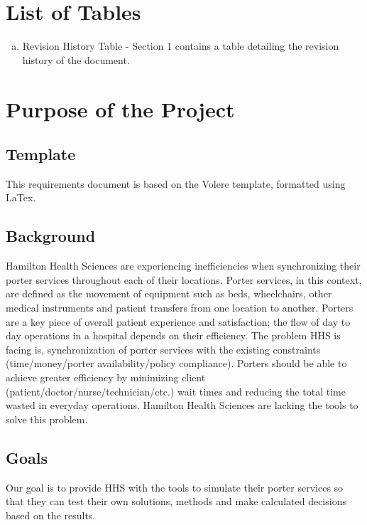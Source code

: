 \documentclass[paper=letter, fontsize=10pt]{scrartcl}
\numberwithin{equation}{section}		%
\numberwithin{figure}{section}			%
\numberwithin{table}{section}				%
\begin{document}
\section{List of Tables}
\begin{enumerate}[(a)]
	\item Revision History Table - Section 1 contains a table detailing the revision history of the document.
\end{enumerate}

\section{Purpose of the Project}
\subsection{Template}
This requirements document is based on the Volere template, formatted using LaTex.
\subsection{Background}
Hamilton Health Sciences are experiencing inefficiencies when synchronizing their porter services throughout each of their locations. Porter services, in this context, are defined as the movement of equipment such as beds, wheelchairs, other medical instruments and patient transfers from one location to another. Porters are a key piece of overall patient experience and satisfaction; the flow of day to day operations in a hospital depends on their efficiency. The problem HHS is facing is, synchronization of porter services with the existing constraints (time/money/porter availability/policy compliance).  Porters should be able to achieve greater efficiency by minimizing client (patient/doctor/nurse/technician/etc.) wait times and reducing the total time wasted in everyday operations. Hamilton Health Sciences are lacking the tools to solve this problem.
\subsection{Goals}
Our goal is to provide HHS with the tools to simulate their porter services so that they can test their own solutions, methods and make calculated decisions based on the results.
\end{document}

